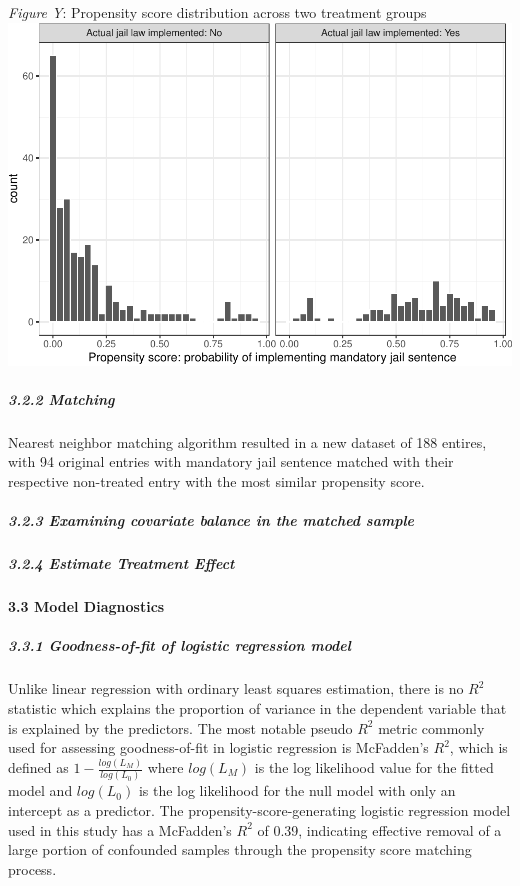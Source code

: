 \documentclass[]{article}
\let\oldparagraph\paragraph
\renewcommand{\paragraph}[1]{\oldparagraph{#1}\mbox{}}
\let\oldsubparagraph\subparagraph
\renewcommand{\subparagraph}[1]{\oldsubparagraph{#1}\mbox{}}
\begin{document}
\emph{Figure Y}: Propensity score distribution across two treatment
groups
\includegraphics{Project3_Rongkui_files/figure-latex/unnamed-chunk-15-1.pdf}

\hypertarget{matching-1}{%
\subparagraph{3.2.2 Matching}\label{matching-1}}

Nearest neighbor matching algorithm resulted in a new dataset of 188
entires, with 94 original entries with mandatory jail sentence matched
with their respective non-treated entry with the most similar propensity
score.

\hypertarget{examining-covariate-balance-in-the-matched-sample-1}{%
\subparagraph{3.2.3 Examining covariate balance in the matched
sample}\label{examining-covariate-balance-in-the-matched-sample-1}}

\hypertarget{estimate-treatment-effect-1}{%
\subparagraph{3.2.4 Estimate Treatment
Effect}\label{estimate-treatment-effect-1}}

\hypertarget{model-diagnostics-1}{%
\paragraph{3.3 Model Diagnostics}\label{model-diagnostics-1}}

\hypertarget{goodness-of-fit-of-logistic-regression-model}{%
\subparagraph{3.3.1 Goodness-of-fit of logistic regression
model}\label{goodness-of-fit-of-logistic-regression-model}}

Unlike linear regression with ordinary least squares estimation, there
is no \(R^2\) statistic which explains the proportion of variance in the
dependent variable that is explained by the predictors. The most notable
pseudo \(R^2\) metric commonly used for assessing goodness-of-fit in
logistic regression is McFadden's \(R^2\), which is defined as
\(1−\frac{log(L_M)}{log(L_0)}\) where \(log(L_M)\) is the log likelihood
value for the fitted model and \(log(L_0)\) is the log likelihood for
the null model with only an intercept as a predictor. The
propensity-score-generating logistic regression model used in this study
has a McFadden's \(R^2\) of 0.39, indicating effective removal of a
large portion of confounded samples through the propensity score
matching process.
\end{document}
